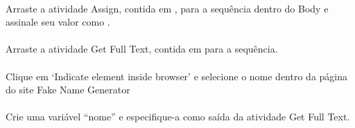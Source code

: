 \documentclass[letterpaper,10pt,brazil]{sphinxmanual}
\begin{document}
\paragraph{}
\label{\detokenize{exercise_2:xii-inserir-atividade-assign}}
Arraste a atividade Assign, contida em , para a sequência dentro do Body e assinale seu valor como .
\begin{quote}

\begin{figure}[htbp]
\centering

\noindent{}
\end{figure}
\end{quote}


\paragraph{}
\label{\detokenize{exercise_2:xiii-inserir-getfulltext}}
Arraste a atividade Get Full Text, contida em  para a sequência.

\begin{figure}[htbp]
\centering

\noindent{}
\end{figure}


\paragraph{}
\label{\detokenize{exercise_2:xiv-inserir-nome}}
Clique em ‘Indicate element inside browser’ e selecione o nome dentro da página do site Fake Name Generator

\begin{figure}[htbp]
\centering

\noindent{}
\end{figure}


\paragraph{}
\label{\detokenize{exercise_2:xv-criar-variavel-nome}}
Crie uma variável “nome” e especifique-a como saída da atividade Get Full Text.
\end{document}
